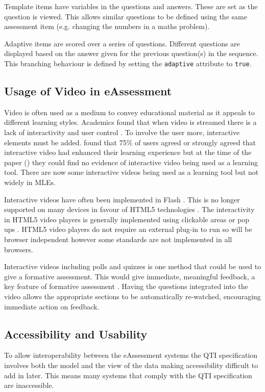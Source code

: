 Template items have variables in the questions and answers. These are set as the question is viewed. This allows similar questions to be defined using the same assessment item (e.g. changing the numbers in a maths problem).

Adaptive items are scored over a series of questions. Different questions are displayed based on the answer given for the previous question(s) in the sequence. This branching behaviour is defined by setting the \lstinline!adaptive! attribute to \lstinline!true!. 

\subsection{Usage of Video in eAssessment}
\label{Subsection:Usage of Video in eAssessment}
Video is often used as a medium to convey educational material as it appeals to different learning styles. Academics found that when video is streamed there is a lack of interactivity and user control \citep{eps267281, DeBoer}. To involve the user more, interactive elements must be added.  \citep{eps267281} found that 75\% of users agreed or strongly agreed that interactive video had enhanced their learning experience but at the time of the paper (\citeyear{eps267281}) they could find no evidence of interactive video being used as a learning tool. There are now some interactive videos being used as a learning tool \citep{nadia} but not widely in \glspl{MLE}.

Interactive videos have often been implemented in Flash \citep{interactiveVideo, eps267281}. This is no longer supported on many devices in favour of HTML5 technologies \citep{flashDead}. The interactivity in HTML5 video players is generally implemented using clickable areas or pop ups \citep{interactiveHTML5}. HTML5 video players do not require an external plug-in to run so will be browser independent \citep{epifania2011design, interactiveHTML5} however some standards are not implemented in all browsers. 

Interactive videos including polls and quizzes is one method that could be used to give a formative assessment. This would give immediate, meaningful feedback, a key feature of formative assessment \citep{eps265979}. Having the questions integrated into the video allows the appropriate sections to be automatically re-watched, encouraging immediate action on feedback. 

\subsection{Accessibility and Usability}
\label{Subsection:Accessibility and Usability}
To allow interoperability between the \gls{eAssessment} systems the \gls{QTI} specification involves both the model and the view of the data \citep{wikieassessment} making accessibility difficult to add in later. This means many systems that comply with the \gls{QTI} specification are inaccessible.

